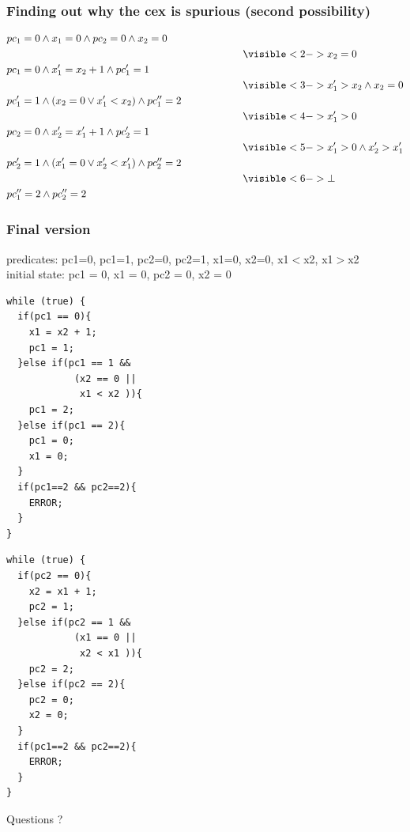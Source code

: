 \documentclass{beamer}
\begin{document}
\begin{frame}
  \frametitle{Finding out why the cex is spurious (second possibility)}

\begin{align*}
& pc_1=0 \land x_1=0 \land pc_2=0 \land x_2=0 \\
& \hspace{8cm} \visible<2->{x_2=0} \\
& pc_1=0 \land x_1' = x_2 + 1 \land pc_1' = 1 \\
& \hspace{8cm} \visible<3->{x_1' > x_2 \land x_2 = 0} \\
& pc_1'=1 \land (x_2=0 \lor x_1'<x_2) \land pc_1'' = 2 \\
& \hspace{8cm} \visible<4->{x_1' > 0}\\
& pc_2=0 \land x_2' = x_1' + 1 \land pc_2' = 1 \\
& \hspace{8cm} \visible<5->{x_1' > 0 \land x_2' > x_1'} \\
& pc_2'=1 \land (x_1'=0 \lor x_2'<x_1') \land pc_2'' = 2 \\
& \hspace{8cm} \visible<6->{\bot}\\
& pc_1''=2 \land pc_2''=2
\end{align*}
\end{frame}

\begin{frame}[fragile]
  \frametitle{Final version}

{\footnotesize
predicates: pc1=0, pc1=1, pc2=0, pc2=1, x1=0, x2=0, x1$<$x2, x1$>$x2\\
initial state: pc1 = 0, x1 = 0, pc2 = 0, x2 = 0
}
\vfill
\begin{minipage}{0.45\linewidth}
\begin{lstlisting}
while (true) {
  if(pc1 == 0){
    x1 = x2 + 1;
    pc1 = 1;
  }else if(pc1 == 1 &&
            (x2 == 0 ||
             x1 < x2 )){
    pc1 = 2;
  }else if(pc1 == 2){
    pc1 = 0;
    x1 = 0;
  }
  if(pc1==2 && pc2==2){
    ERROR;
  }
}
\end{lstlisting}
\end{minipage}
\hfill
\begin{minipage}{0.45\linewidth}
\begin{lstlisting}
while (true) {
  if(pc2 == 0){
    x2 = x1 + 1;
    pc2 = 1;
  }else if(pc2 == 1 &&
            (x1 == 0 ||
             x2 < x1 )){
    pc2 = 2;
  }else if(pc2 == 2){
    pc2 = 0;
    x2 = 0;
  }
  if(pc1==2 && pc2==2){
    ERROR;
  }
}
\end{lstlisting}
\end{minipage}
\end{frame}


\begin{frame}

\begin{center}
\Huge
Questions ?
\end{center}
\end{frame}
\end{document}
